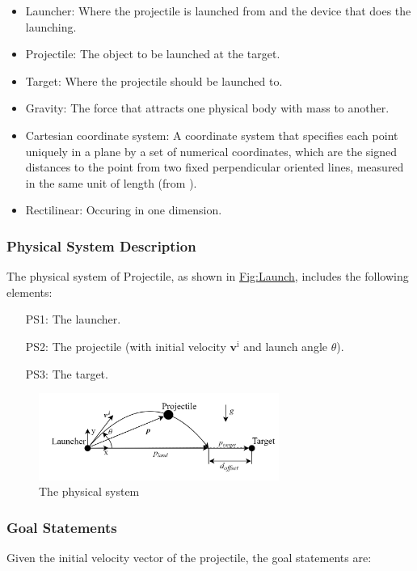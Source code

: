 \documentclass[12pt]{article}
\begin{document}
\begin{itemize}
\item{Launcher: Where the projectile is launched from and the device that does the launching.}
\item{Projectile: The object to be launched at the target.}
\item{Target: Where the projectile should be launched to.}
\item{Gravity: The force that attracts one physical body with mass to another.}
\item{Cartesian coordinate system: A coordinate system that specifies each point uniquely in a plane by a set of numerical coordinates, which are the signed distances to the point from two fixed perpendicular oriented lines, measured in the same unit of length (from \cite{cartesianWiki}).}
\item{Rectilinear: Occuring in one dimension.}
\end{itemize}
\subsubsection{Physical System Description}
\label{Sec:PhysSyst}
The physical system of Projectile, as shown in \hyperref[Figure:Launch]{Fig:Launch}, includes the following elements:

\begin{itemize}
\item[PS1:]{The launcher.}
\item[PS2:]{The projectile (with initial velocity ${\symbf{v}^{\text{i}}}$ and launch angle $θ$).}
\item[PS3:]{The target.}
\end{itemize}
\begin{figure}
\begin{center}
\includegraphics[width=0.7\textwidth]{../../../../datafiles/projectile/Launch.jpg}
\caption{The physical system}
\label{Figure:Launch}
\end{center}
\end{figure}
\subsubsection{Goal Statements}
\label{Sec:GoalStmt}
Given the initial velocity vector of the projectile, the goal statements are:
\end{document}
